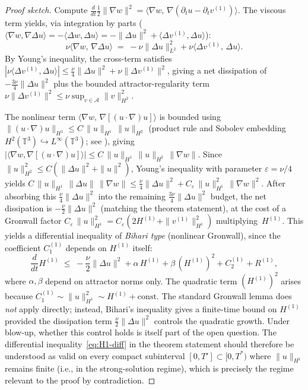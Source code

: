 \documentclass[12pt,a4paper]{article}
\theoremstyle{definition}
\theoremstyle{plain}
\theoremstyle{remark}
\begin{document}
\begin{proof}[Proof sketch]
Compute $\frac{d}{dt}\frac{1}{2}\|\nabla w\|^2
= \langle \nabla w,\,\nabla(\partial_t u - \partial_t v^{(1)})\rangle$.
The viscous term yields, via integration by parts
($\langle \nabla w, \nabla\Delta u\rangle
= -\langle \Delta w, \Delta u\rangle
= -\|\Delta u\|^2 + \langle \Delta v^{(1)}, \Delta u\rangle$):
\[
  \nu\langle \nabla w,\, \nabla\Delta u \rangle
  \;=\; -\nu\|\Delta u\|_{L^2}^2
        + \nu\langle \Delta v^{(1)},\, \Delta u \rangle.
\]
By Young's inequality, the cross-term satisfies
$|\nu\langle \Delta v^{(1)}, \Delta u\rangle|
\le \frac{\nu}{4}\|\Delta u\|^2 + \nu\|\Delta v^{(1)}\|^2$,
giving a net dissipation of $-\frac{3\nu}{4}\|\Delta u\|^2$
plus the bounded attractor-regularity term
$\nu\|\Delta v^{(1)}\|^2 \le \nu\sup_{v\in\mathcal{A}}\|v\|_{H^2}^2$.

The nonlinear term $\langle \nabla w,\, \nabla[(u\cdot\nabla)u]\rangle$
is bounded using
$\|(u\cdot\nabla)u\|_{H^1} \le C\,\|u\|_{H^1}\,\|u\|_{H^2}$
(product rule and Sobolev embedding $H^2(\mathbb{T}^3) \hookrightarrow
L^\infty(\mathbb{T}^3)$; see \cite{ConstantinFoias1988}), giving
$|\langle \nabla w, \nabla[(u\cdot\nabla)u]\rangle|
\le C\,\|u\|_{H^1}\,\|u\|_{H^2}\,\|\nabla w\|$.
Since $\|u\|_{H^2}^2 \le C(\|\Delta u\|^2 + \|u\|^2)$,
Young's inequality with parameter $\varepsilon = \nu/4$ yields
$C\,\|u\|_{H^1}\,\|\Delta u\|\,\|\nabla w\|
\le \frac{\nu}{4}\|\Delta u\|^2
+ C_\varepsilon\,\|u\|_{H^1}^2\,\|\nabla w\|^2$.
After absorbing this $\frac{\nu}{4}\|\Delta u\|^2$ into the remaining
$\frac{3\nu}{4}\|\Delta u\|^2$ budget, the net dissipation is
$-\frac{\nu}{2}\|\Delta u\|^2$ (matching the theorem statement),
at the cost of a Gronwall factor
$C_\varepsilon\,\|u\|_{H^1}^2 = C_\varepsilon(2H^{(1)}
+ \|v^{(1)}\|_{H^1}^2)$ multiplying~$H^{(1)}$.
This yields a differential inequality of \emph{Bihari type}
(nonlinear Gronwall), since the coefficient $C_1^{(1)}$ depends
on $H^{(1)}$ itself:
\[
  \frac{d}{dt}H^{(1)}
  \;\le\;
  -\frac{\nu}{2}\|\Delta u\|^2
  + \alpha\,H^{(1)}
  + \beta\,(H^{(1)})^2
  + C_2^{(1)}
  + R^{(1)},
\]
where $\alpha, \beta$ depend on attractor norms only.
The quadratic term $(H^{(1)})^2$ arises because
$C_1^{(1)} \sim \|u\|_{H^1}^2 \sim H^{(1)} + \mathrm{const}$.
The standard Gronwall lemma does \emph{not} apply directly;
instead, Bihari's inequality gives a finite-time bound on $H^{(1)}$
provided the dissipation term $\frac{\nu}{2}\|\Delta u\|^2$
controls the quadratic growth.  Under blow-up, whether this
control holds is itself part of the open question.  The
differential inequality~\eqref{eq:H1-diff} in the theorem
statement should therefore be understood as valid on every
compact subinterval $[0,T'] \subset [0,T^*)$ where
$\|u\|_{H^1}$ remains finite (i.e., in the strong-solution regime),
which is precisely the regime relevant to the proof by contradiction.


\end{proof}
\end{document}
